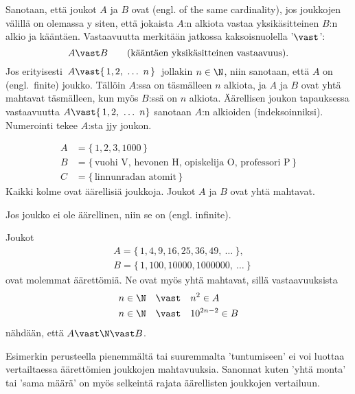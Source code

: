 Sanotaan, että joukot $A$ ja $B$ ovat  (engl. of the same cardinality), jos 
joukkojen välillä on olemassa  y  siten, 
että jokaista $A$:n alkiota vastaa yksikäsitteinen $B$:n alkio ja kääntäen. Vastaavuutta 
merkitään jatkossa kaksoisnuolella '$\vast$':
\[
A \vast B \qquad \text{(kääntäen yksikäsitteinen vastaavuus)}. \\
\]
Jos erityisesti $\,A \vast \{\,1,2,\ \ldots\ n\,\}\,$ jollakin $n\in\N$, niin sanotaan, että 
$A$ on  (engl.\ finite) joukko. Tällöin $A$:ssa on täsmälleen $n$ alkiota, ja 
$A$ ja $B$ ovat yhtä mahtavat täsmälleen, kun myös $B$:ssä on $n$ alkiota. Äärellisen joukon
tapauksessa vastaavuutta $A \vast \{\,1,2,\ \ldots\ n \}$ sanotaan $A$:n alkioiden 
 (indeksoinniksi). Numerointi tekee $A$:sta jjy
joukon. 
\begin{Exa}
\begin{align*}
A &= \{\,1,2,3,1000\,\} \\
B &= \{\,\text{vuohi V, hevonen H, opiskelija O, professori P}\,\} \\
C &= \{\,\text{linnunradan atomit}\,\}
\end{align*}
Kaikki kolme ovat äärellisiä joukkoja. Joukot $A$ ja $B$ ovat yhtä mahtavat. \loppu 
\end{Exa}
%
Jos joukko ei ole äärellinen, niin se on  (engl. infinite).
\begin{Exa} \label{numer} Joukot
\begin{align*}
&A = \{\,1,4,9,16,25,36,49,\ \ldots\ \}, \\
&B = \{\,1,100,10000,1000000,\ \ldots\ \}
\end{align*}
ovat molemmat äärettömiä. Ne ovat myös yhtä mahtavat, sillä vastaavuuksista
\begin{align*}
n \in \N \quad &\vast \quad n^2 \in A \\
n \in \N \quad &\vast \quad 10^{2n-2} \in B
\end{align*}
nähdään, että $A \vast \N \vast B$. \loppu \end{Exa}
Esimerkin perusteella pienemmältä tai suuremmalta 'tuntumiseen' ei voi luottaa vertailtaessa 
äärettömien joukkojen mahtavuuksia. Sanonnat kuten 'yhtä monta' tai 'sama määrä' on myös
selkeintä rajata äärellisten joukkojen vertailuun.

